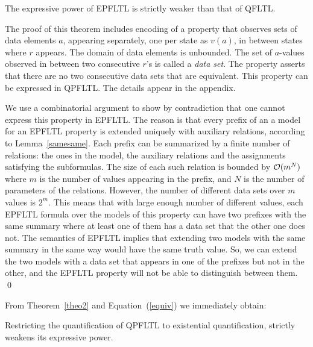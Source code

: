 \begin{theorem}
\label{theo2}
The expressive power of EPFLTL is strictly weaker than that of QFLTL.
\end{theorem}

The proof of this theorem includes encoding of a  property that
observes sets of data elements $a$, appearing separately, one per state as $v (a)$,
in between states where $r$ appears. The domain of data elements is unbounded.
The set of $a$-values observed in between two consecutive $r$'s is called a {\em data set}.
The property asserts that there are no two consecutive data sets that are equivalent.
This property can be expressed in QPFLTL. The details appear in the appendix.

We use a combinatorial argument to show by contradiction that one cannot express this property
in EPFLTL. The reason is that every prefix of an a model for an EPFLTL property is extended uniquely with
auxiliary relations, according to Lemma~\ref{samesame}. Each prefix can be summarized by a finite number of relations: the ones in
the model, the auxiliary relations and the
assignments satisfying the subformulas. The size of
each such relation is bounded by ${\cal O} (  m ^ N )$
where $m$ is the number of values appearing in the
prefix, and $N$ is the number of parameters of the relations.
However, the number of different data sets over $m$ values is
$2^m$. This means that with large enough number of different values, each EPFLTL formula over the models of this property can have two prefixes with the same summary where at least one of them has a data set that the other one does not. The semantics of EPFLTL implies that extending
two models with the same summary in the same way would have the same truth value. So, we can extend
the two models with a data set that appears in one of the
prefixes but not  in the other, and the EPFLTL property will not be able to distinguish between them. \qed



\vspace{0.7ex} From Theorem~\ref{theo2} and Equation~(\ref{equiv}) we immediately obtain:
\begin{corollary}
Restricting the quantification of QPFLTL to existential quantification, strictly weakens its expressive power.
\end{corollary}

